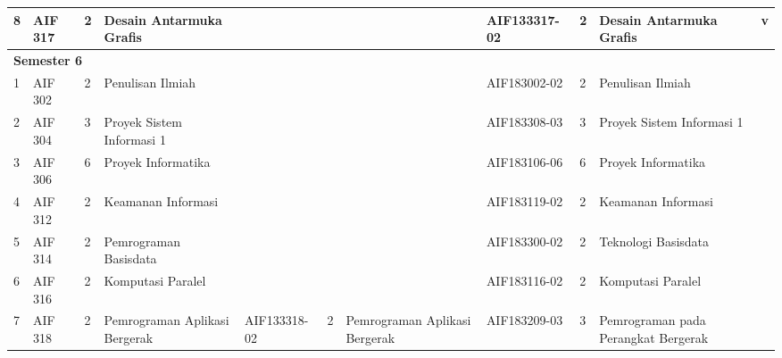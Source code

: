 \begin{landscape}
\begin{table}[H]
\begin{tabular}{|p{0.35cm}|p{1.75cm}|p{0.65cm}|p{3.55cm}|p{2.1cm}|p{0.65cm}|p{3.55cm}|p{2.1cm}|p{0.65cm}|p{3.55cm}|p{1.75cm}|}
8 & AIF 317 & 2 & Desain Antarmuka Grafis &  &  &  & AIF133317-02 & 2 & Desain Antarmuka Grafis & v \\ \hline
\multicolumn{11}{|l|}{\textbf{Semester 6}} \\ \hline
1 & AIF 302 & 2 & Penulisan Ilmiah &  &  &  & AIF183002-02 & 2 & Penulisan Ilmiah &  \\ \hline
2 & AIF 304 & 3 & Proyek Sistem Informasi 1 &  &  &  & AIF183308-03 & 3 & Proyek Sistem Informasi 1 &  \\ \hline
3 & AIF 306 & 6 & Proyek Informatika &  &  &  & AIF183106-06 & 6 & Proyek Informatika &  \\ \hline
4 & AIF 312 & 2 & Keamanan Informasi &  &  &  & AIF183119-02 & 2 & Keamanan Informasi &  \\ \hline
5 & AIF 314 & 2 & Pemrograman Basisdata &  &  &  & AIF183300-02 & 2 & Teknologi Basisdata &  \\ \hline
6 & AIF 316 & 2 & Komputasi Paralel &  &  &  & AIF183116-02 & 2 & Komputasi Paralel &  \\ \hline
7 & AIF 318 & 2 & Pemrograman Aplikasi Bergerak & AIF133318-02 & 2 & Pemrograman Aplikasi Bergerak & AIF183209-03 & 3 & Pemrograman pada Perangkat Bergerak &  \\ \hline
\end{tabular}
\end{table}


\end{landscape}
